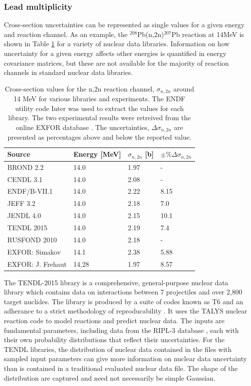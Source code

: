 \subsubsection{Lead multiplicity}

Cross-section uncertainties can be represented as single values for a given energy and reaction channel. As an example, the $^{208}$Pb(n,2n)$^{207}$Pb reaction at 14MeV is shown in Table \ref{tab:lead_by_lib} for a variety of nuclear data libraries. Information on how uncertainty for a given energy affects other energies is quantified in energy covariance matrices, but these are not available for the majority of reaction channels in standard nuclear data libraries.

\begin{table}[ht]
  \footnotesize
  \centering
  \begin{tabularx}{\textwidth}{XXXX}
    \toprule
    Source & Energy [MeV] & $\sigma_{n,2n}$ [b] & $\pm\%\Delta\sigma_{n,2n}$ \\
    \midrule
    BROND 2.2 & 14.0 & 1.97 & - \\
    CENDL 3.1 & 14.0 & 2.08 & - \\
    ENDF/B-VII.1 & 14.0 & 2.22 & 8.15 \\
    JEFF 3.2 & 14.0 & 2.18 & 7.0 \\
    JENDL 4.0 & 14.0 & 2.15 & 10.1 \\
    TENDL 2015 & 14.0 & 2.19 & 7.4 \\
    RUSFOND 2010 & 14.0 & 2.18 & - \\
    EXFOR: Simakov & 14.1 & 2.38 & 5.88 \\
    EXFOR: J. Frehaut & 14.28 & 1.97 & 8.57 \\
    \bottomrule
  \end{tabularx}
  \caption{Cross-section values for the n,2n reaction channel, $\sigma_{n,2n}$ around 14 MeV for various libraries and experiments. The ENDF utility code Inter \cite{inter} was used to extract the values for each library. The two experimental results were retreived from the online EXFOR database \cite{exfor2017}. The uncertainties, $\Delta\sigma_{n,2n}$ are presented as percentages above and below the reported value.}
  \label{tab:lead_by_lib}
\end{table}

The TENDL-2015 library is a comprehensive, general-purpose nuclear data library which contains data on interactions between 7 projectiles and over 2,800 target nuclides. The library is produced by a suite of codes known as T6 and an adherance to a strict methodology of reproducability \cite{Rochman2016}. It uses the TALYS nuclear reaction code to model reactions and predict nuclear data. The inputs are fundamental parameters, including data from the RIPL-3 database \cite{RIPL3}, each with their own probability distributions that reflect their uncertainties. For the TENDL libraries, the distribution of nuclear data contained in the files with sampled input parameters can give more information on nuclear data uncertainty than is contained in a traditional evaluated nuclear data file. The shape of the distribution are captured and need not necessarily be simple Gaussian.

